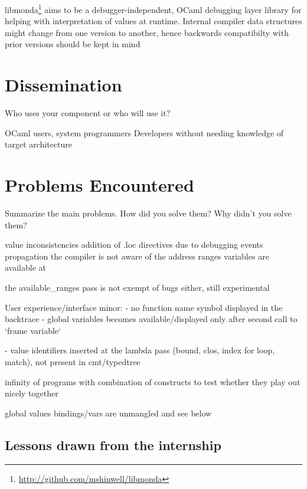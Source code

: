 libmonda\footnote{\url{http://github.com/mshinwell/libmonda}} aims to be a
debugger-independent, OCaml debugging layer library for helping with
interpretation of values at runtime.
Internal compiler data structures might change from one version to another,
hence backwards compatibilty with prior versions should be kept in mind

\section{Dissemination\label{sec:dissemination}}

Who uses your component or who will use it?

OCaml users, system programmers
Developers without needing knowledge of target architecture

\section{Problems Encountered\label{sec:problems}}

Summarize the main problems. How did you solve them? Why didn't you solve them?

value inconsistencies
addition of .loc directives due to debugging events propagation the compiler is not aware of
the address ranges variables are available at

the available\_ranges pass is not exempt of bugs either, still experimental


User experience/interface minor:
- no function name symbol displayed in the backtrace
- global variables becomes available/displayed only after second call to `frame variable`

- value identifiers inserted at the lambda pass (bound, clos, index for loop,
match), not present in cmt/typedtree

infinity of programs with combination of constructs to test whether they play
out nicely together


global values bindings/vars are unmangled and see below



\subsection{Lessons drawn from the internship}

